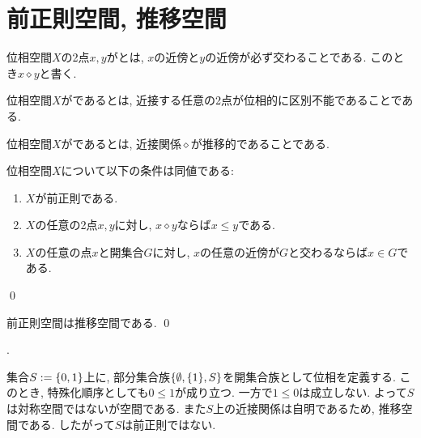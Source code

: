 \documentclass[uplatex, dvipdfmx, a4paper, 12pt, class=jsbook, crop=false]{standalone}
\begin{document}
\section{前正則空間, 推移空間}
\label{sec:preregular-spaces}

\newcommand{\topleq}{\leq}
\newcommand{\topnear}{\mathrel{\diamond}}
\newcommand{\convto}{\rightsquigarrow}
\newcommand{\Llim}{\mathop{\mathrm{Lim}}\nolimits}

\begin{definition}
	位相空間\(X\)の2点\(x, y\)がとは,
	\(x\)の近傍と\(y\)の近傍が必ず交わることである.
	このとき\(x \topnear y\)と書く.
\end{definition}

\begin{definition}
	位相空間\(X\)がであるとは,
	近接する任意の2点が位相的に区別不能であることである.
\end{definition}

\begin{definition}
	位相空間\(X\)がであるとは,
	近接関係\(\topnear\)が推移的であることである.
\end{definition}

\begin{proposition}
	位相空間\(X\)について以下の条件は同値である:
	\begin{enumerate}
		\item \(X\)が前正則である.
		\item \(X\)の任意の2点\(x, y\)に対し, \(x \topnear y\)ならば\(x \leq y\)である.
		\item \(X\)の任意の点\(x\)と開集合\(G\)に対し, \(x\)の任意の近傍が\(G\)と交わるならば\(x \in G\)である.
	\end{enumerate}
	\qed
\end{proposition}

\begin{proposition}
	前正則空間は推移空間である.
	\qed
\end{proposition}

\begin{example}[\Sierpinski 空間]
	\WIP.

	集合\(S \defeq \lrbrace{0, 1}\)上に,
	部分集合族\(\lrbrace{\emptyset, \lrbrace{1}, S}\)を開集合族として位相を定義する.
	このとき, 特殊化順序としても\(0 \leq 1\)が成り立つ.
	一方で\(1 \leq 0\)は成立しない.
	よって\(S\)は対称空間ではないが空間である.
	また\(S\)上の近接関係は自明であるため, 推移空間である.
	したがって\(S\)は前正則ではない.
\end{example}
\end{document}
